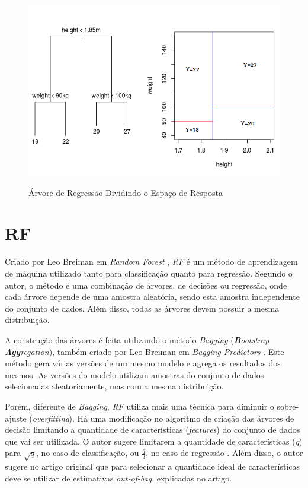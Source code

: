  \begin{figure}[htbp]
    \centering
    \includegraphics[scale=0.6]{monography/img/models/regression_tree.png}
    \label{figure:tree}
    \caption[Árvore de Regressão Dividindo o Espaço de Resposta]{Árvore de Regressão Dividindo o Espaço de Resposta\footnotemark}
\end{figure}


\section{\acrfull{RF}}

Criado por Leo Breiman em \textit{Random Forest} \cite{Breiman:2001:RF:570181.570182}, \textit{\acrshort{RF}} é um método de aprendizagem de máquina utilizado tanto para classificação quanto para regressão. Segundo o autor, o método é uma combinação de árvores, de decisões ou regressão, onde cada árvore depende de uma amostra aleatória, sendo esta amostra independente do conjunto de dados. Além disso, todas as árvores devem possuir a mesma distribuição. 

A construção das árvores é feita utilizando o método \textit{Bagging} (\textit{\textbf{B}ootstrap \textbf{Agg}regation}), também criado por Leo Breiman em \textit{Bagging Predictors} \cite{Breiman:1996:BP:231986.231989}. Este método gera várias versões de um mesmo modelo e agrega os resultados dos mesmos. As versões do modelo utilizam amostras do conjunto de dados selecionadas aleatoriamente, mas com a mesma distribuição.

Porém, diferente de \textit{Bagging}, \textit{\acrshort{RF}} utiliza mais uma técnica para diminuir o sobre-ajuste (\textit{overfitting}). Há uma modificação no algoritmo de criação das árvores de decisão limitando a quantidade de características (\textit{features}) do conjunto de dados que vai ser utilizada. O autor sugere limitarem a quantidade de características (\textit{q}) para $ \sqrt{q} $, no caso de classificação, ou $ \frac{q}{3} $, no caso de regressão \cite{hastie2005elements}. Além disso, o autor sugere no artigo original que para selecionar a quantidade ideal de características deve se utilizar de estimativas \textit{out-of-bag}, explicadas no artigo.

